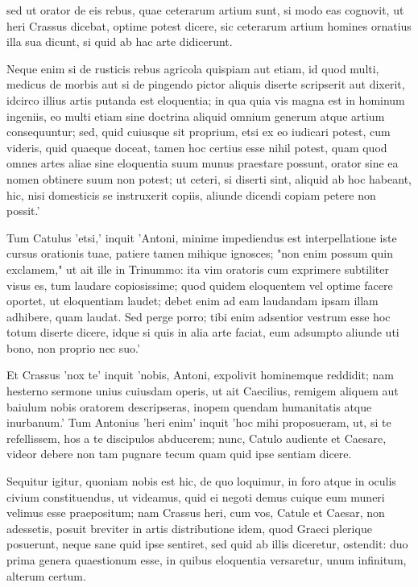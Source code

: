  sed ut orator de eis rebus, quae ceterarum artium sunt, si modo eas cognovit, ut heri Crassus dicebat, optime potest dicere, sic ceterarum artium homines ornatius illa sua dicunt, si quid ab hac arte didicerunt.

 Neque enim si de rusticis rebus agricola quispiam aut etiam, id quod multi, medicus de morbis aut si de pingendo pictor aliquis diserte scripserit aut dixerit, idcirco illius artis putanda est eloquentia; in qua quia vis magna est in hominum ingeniis, eo multi etiam sine doctrina aliquid omnium generum atque artium consequuntur; sed, quid cuiusque sit proprium, etsi ex eo iudicari potest, cum videris, quid quaeque doceat, tamen hoc certius esse nihil potest, quam quod omnes artes aliae sine eloquentia suum munus praestare possunt, orator sine ea nomen obtinere suum non potest; ut ceteri, si diserti sint, aliquid ab hoc habeant, hic, nisi domesticis se instruxerit copiis, aliunde dicendi copiam petere non possit.'

 Tum Catulus 'etsi,' inquit 'Antoni, minime impediendus est interpellatione iste cursus orationis tuae, patiere tamen mihique ignosces; "non enim possum quin exclamem," ut ait ille in Trinummo: ita vim oratoris cum exprimere subtiliter visus es, tum laudare copiosissime; quod quidem eloquentem vel optime facere oportet, ut eloquentiam laudet; debet enim ad eam laudandam ipsam illam adhibere, quam laudat. Sed perge porro; tibi enim adsentior vestrum esse hoc totum diserte dicere, idque si quis in alia arte faciat, eum adsumpto aliunde uti bono, non proprio nec suo.'

 Et Crassus 'nox te' inquit 'nobis, Antoni, expolivit hominemque reddidit; nam hesterno sermone unius cuiusdam operis, ut ait Caecilius, remigem aliquem aut baiulum nobis oratorem descripseras, inopem quendam humanitatis atque inurbanum.' Tum Antonius 'heri enim' inquit 'hoc mihi proposueram, ut, si te refellissem, hos a te discipulos abducerem; nunc, Catulo audiente et Caesare, videor debere non tam pugnare tecum quam quid ipse sentiam dicere.

 Sequitur igitur, quoniam nobis est hic, de quo loquimur, in foro atque in oculis civium constituendus, ut videamus, quid ei negoti demus cuique eum muneri velimus esse praepositum; nam Crassus heri, cum vos, Catule et Caesar, non adessetis, posuit breviter in artis distributione idem, quod Graeci plerique posuerunt, neque sane quid ipse sentiret, sed quid ab illis diceretur, ostendit: duo prima genera quaestionum esse, in quibus eloquentia versaretur, unum infinitum, alterum certum.

